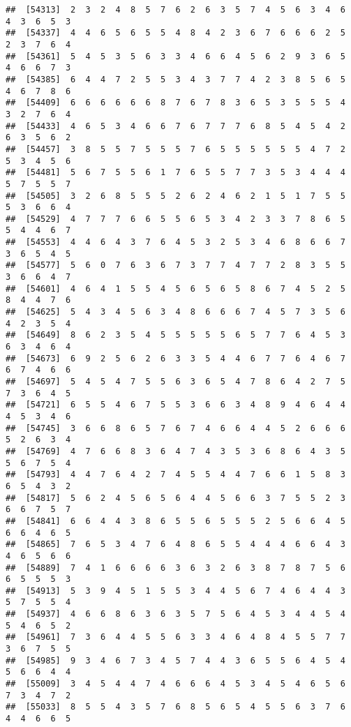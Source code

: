\documentclass[
]{book}
\begin{document}
\begin{verbatim}
##  [54313]  2  3  2  4  8  5  7  6  2  6  3  5  7  4  5  6  3  4  6  4  3  6  5  3
##  [54337]  4  4  6  5  6  5  5  4  8  4  2  3  6  7  6  6  6  2  5  2  3  7  6  4
##  [54361]  5  4  5  3  5  6  3  3  4  6  6  4  5  6  2  9  3  6  5  4  6  6  7  3
##  [54385]  6  4  4  7  2  5  5  3  4  3  7  7  4  2  3  8  5  6  5  4  6  7  8  6
##  [54409]  6  6  6  6  6  6  8  7  6  7  8  3  6  5  3  5  5  5  4  3  2  7  6  4
##  [54433]  4  6  5  3  4  6  6  7  6  7  7  7  6  8  5  4  5  4  2  6  3  5  6  2
##  [54457]  3  8  5  5  7  5  5  5  7  6  5  5  5  5  5  5  4  7  2  5  3  4  5  6
##  [54481]  5  6  7  5  5  6  1  7  6  5  5  7  7  3  5  3  4  4  4  5  7  5  5  7
##  [54505]  3  2  6  8  5  5  5  2  6  2  4  6  2  1  5  1  7  5  5  5  3  6  6  4
##  [54529]  4  7  7  7  6  6  5  5  6  5  3  4  2  3  3  7  8  6  5  5  4  4  6  7
##  [54553]  4  4  6  4  3  7  6  4  5  3  2  5  3  4  6  8  6  6  7  3  6  5  4  5
##  [54577]  5  6  0  7  6  3  6  7  3  7  7  4  7  7  2  8  3  5  5  3  6  6  4  7
##  [54601]  4  6  4  1  5  5  4  5  6  5  6  5  8  6  7  4  5  2  5  8  4  4  7  6
##  [54625]  5  4  3  4  5  6  3  4  8  6  6  6  7  4  5  7  3  5  6  4  2  3  5  4
##  [54649]  8  6  2  3  5  4  5  5  5  5  5  6  5  7  7  6  4  5  3  6  3  4  6  4
##  [54673]  6  9  2  5  6  2  6  3  3  5  4  4  6  7  7  6  4  6  7  6  7  4  6  6
##  [54697]  5  4  5  4  7  5  5  6  3  6  5  4  7  8  6  4  2  7  5  7  3  6  4  5
##  [54721]  6  5  5  4  6  7  5  5  3  6  6  3  4  8  9  4  6  4  4  4  5  3  4  6
##  [54745]  3  6  6  8  6  5  7  6  7  4  6  6  4  4  5  2  6  6  6  5  2  6  3  4
##  [54769]  4  7  6  6  8  3  6  4  7  4  3  5  3  6  8  6  4  3  5  5  6  7  5  4
##  [54793]  4  4  7  6  4  2  7  4  5  5  4  4  7  6  6  1  5  8  3  6  5  4  3  2
##  [54817]  5  6  2  4  5  6  5  6  4  4  5  6  6  3  7  5  5  2  3  6  6  7  5  7
##  [54841]  6  6  4  4  3  8  6  5  5  6  5  5  5  2  5  6  6  4  5  6  6  4  6  5
##  [54865]  7  6  5  3  4  7  6  4  8  6  5  5  4  4  4  6  6  4  3  4  6  5  6  6
##  [54889]  7  4  1  6  6  6  6  3  6  3  2  6  3  8  7  8  7  5  6  6  5  5  5  3
##  [54913]  5  3  9  4  5  1  5  5  3  4  4  5  6  7  4  6  4  4  3  5  7  5  5  4
##  [54937]  4  6  6  8  6  3  6  3  5  7  5  6  4  5  3  4  4  5  4  5  4  6  5  2
##  [54961]  7  3  6  4  4  5  5  6  3  3  4  6  4  8  4  5  5  7  7  3  6  7  5  5
##  [54985]  9  3  4  6  7  3  4  5  7  4  4  3  6  5  5  6  4  5  4  5  6  6  4  4
##  [55009]  3  4  5  4  4  7  4  6  6  6  4  5  3  4  5  4  6  5  6  7  3  4  7  2
##  [55033]  8  5  5  4  3  5  7  6  8  5  6  5  4  5  5  6  3  7  6  4  4  6  6  5

\end{verbatim}
\end{document}
